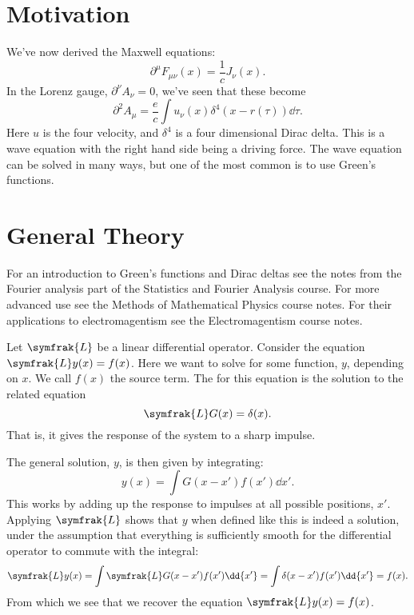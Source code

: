 \documentclass[fleqn]{NotesClass}
\newcommand*{\dalembertian}{\partial^2}
\begin{document}
    \section{Motivation}
    We've now derived the Maxwell equations:
    \begin{equation}
        \partial^\mu F_{\mu\nu} (x) = \frac{1}{c}J_\nu(x).
    \end{equation}
    In the Lorenz gauge, \(\partial^\nu A_\nu = 0\), we've seen that these become
    \begin{equation}
        \dalembertian A_\mu = \frac{e}{c} \int u_\nu(x) \delta^4(x - r(\tau)) \dd{\tau}.
    \end{equation}
    Here \(u\) is the four velocity, and \(\delta^4\) is a four dimensional Dirac delta.
    This is a wave equation with the right hand side being a driving force.
    The wave equation can be solved in many ways, but one of the most common is to use Green's functions.
    
    \section{General Theory}
    \begin{rmk}
        For an introduction to Green's functions and Dirac deltas see the notes from the Fourier analysis part of the Statistics and Fourier Analysis course.
        For more advanced use see the Methods of Mathematical Physics course notes.
        For their applications to electromagentism see the Electromagentism course notes.
    \end{rmk}
    Let \(\symfrak{L}\) be a linear differential operator.
    Consider the equation \(\symfrak{L} y(x) = f(x)\).
    Here we want to solve for some function, \(y\), depending on \(x\).
    We call \(f(x)\) the source term.
    The  for this equation is the solution to the related equation
    \begin{equation}
        \symfrak{L} G(x) = \delta(x).
    \end{equation}
    That is, it gives the response of the system to a sharp impulse.
    
    The general solution, \(y\), is then given by integrating:
    \begin{equation}
        y(x) = \int G(x - x') f(x') \dd{x'}.
    \end{equation}
    This works by adding up the response to impulses at all possible positions, \(x'\).
    Applying \(\symfrak{L}\) shows that \(y\) when defined like this is indeed a solution, under the assumption that everything is sufficiently smooth for the differential operator to commute with the integral:
    \begin{equation}
        \symfrak{L} y(x) = \int \symfrak{L} G(x - x') f(x') \dd{x'} = \int \delta(x - x') f(x') \dd{x'} = f(x).
    \end{equation}
    From which we see that we recover the equation \(\symfrak{L}y(x) = f(x)\).
    
\end{document}

